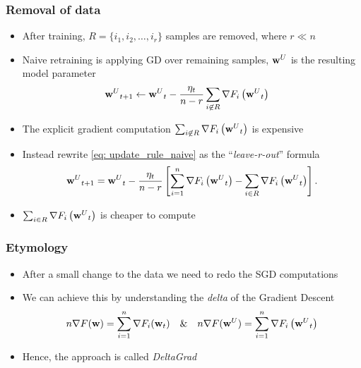 \documentclass[pdf]{beamer}
\begin{document}
\begin{frame}
  \frametitle{Removal of data}
  \begin{itemize}
    \item<1-> After training,  $R = \{i_1,i_2,\dots,i_r\}$ samples are removed, where $r \ll n$
    \item<2-> Naive retraining is applying GD over remaining samples, $\textbf{w}^{U}$ is the resulting model parameter
    \begin{align}\label{eq: update_rule_naive} 
      & {\textbf{w}^{U}}_{t+1} \leftarrow {\textbf{w}^{U}}_{t} - \frac{\eta_t}{n-r}\sum_{\substack{i \not\in R}} \nabla F_i\left({\textbf{w}^{U}}_{t}\right) 
    \end{align}
    \item<3-> The explicit gradient computation $\sum_{\substack{i \not\in R}} \nabla F_i\left({\textbf{w}^{U}}_{t}\right)$ is expensive
    \item<4-> Instead rewrite \eqref{eq: update_rule_naive} as the ``\textit{leave-r-out}'' formula
    \begin{align}\label{eq: approx_w_t}
      \begin{split}
      {\textbf{w}^{U}}_{t+1} 
               = {\textbf{w}^{U}}_{t} - \frac{\eta_t}{n-r}\left[\sum_{i=1}^{n} \nabla F_{i}\left({\textbf{w}^{U}}_{t}\right) - \sum_{\substack{i \in R}} \nabla F_i\left({\textbf{w}^{U}}_{t}\right)\right].
      \end{split}
      \end{align}
      \item<5-> $\sum_{\substack{i \in R}} \nabla F_i\left({\textbf{w}^{U}}_{t}\right)$ is cheaper to compute
  \end{itemize}
\end{frame}

\begin{frame}
  \frametitle{Etymology}
  \begin{itemize}
    \item After a small change to the data we need to redo the SGD computations
    \item We can achieve this by understanding the \textit{delta} of the Gradient Descent 
    \[ 
      n\nabla F(\textbf{w}) = \sum_{i=1}^{n}\nabla F_{i}(\textbf{w}_t) \quad \& \quad n\nabla F({\textbf{w}^{U}}) =  \sum_{i=1}^{n} \nabla F_{i}\left({\textbf{w}^{U}}_{t}\right)
    \]
    \item Hence, the approach is called \textit{DeltaGrad}
  \end{itemize}
\end{frame}
\end{document}

